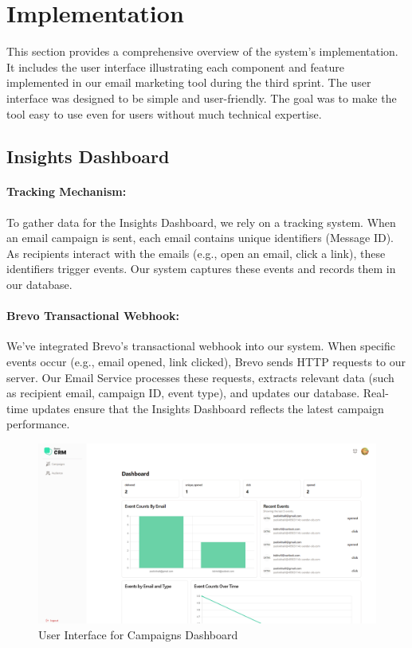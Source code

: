 \section{Implementation}
This section provides a comprehensive overview of the system's implementation. It includes the user interface illustrating each component and feature implemented in our email marketing tool during the third sprint. The user interface was designed to be simple and user-friendly. The goal was to make the tool easy to use even for users without much technical expertise.

\subsection{Insights Dashboard}

\paragraph*{Tracking Mechanism:}
To gather data for the Insights Dashboard, we rely on a tracking system. When an email campaign is sent, each email contains unique identifiers (Message ID). As recipients interact with the emails (e.g., open an email, click a link), these identifiers trigger events. Our system captures these events and records them in our database.

\paragraph*{Brevo Transactional Webhook:}

We've integrated Brevo's transactional webhook into our system. When specific events occur (e.g., email opened, link clicked), Brevo sends HTTP requests to our server. Our Email Service processes these requests, extracts relevant data (such as recipient email, campaign ID, event type), and updates our database. Real-time updates ensure that the Insights Dashboard reflects the latest campaign performance.

\begin{figure}[ht]
	\centering
	\includegraphics[width=\linewidth]{Images/Sprint3/Screenshot 2024-06-04 002816.png}
	\caption{User Interface for Campaigns Dashboard}
	\label{fig:User Interface for Campaigns Dashboard}
\end{figure}